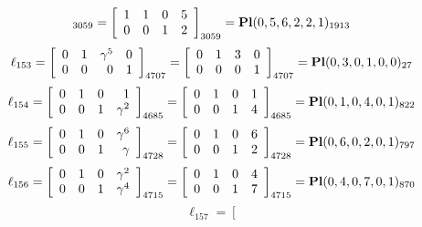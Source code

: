 \documentclass{article}
\begin{document}
{$$_{3059}
=
\left[
\begin{array}{*{4}c}
1  & 1  & 0  & 5\\
0  & 0  & 1  & 2\\
\end{array}
\right]_{3059}
={\rm\bf Pl}(0,5,6,2,2,1 )_{1913}$$
$$
\ell_{153} = 
\left[
\begin{array}{*{4}{r}}
0 & 1 & \gamma^{5} & 0\\
0 & 0 & 0 & 1\\
\end{array}
\right]
_{4707}
=
\left[
\begin{array}{*{4}c}
0  & 1  & 3  & 0\\
0  & 0  & 0  & 1\\
\end{array}
\right]_{4707}
={\rm\bf Pl}(0,3,0,1,0,0 )_{27}$$
$$
\ell_{154} = 
\left[
\begin{array}{*{4}{r}}
0 & 1 & 0 & 1\\
0 & 0 & 1 & \gamma^{2}\\
\end{array}
\right]
_{4685}
=
\left[
\begin{array}{*{4}c}
0  & 1  & 0  & 1\\
0  & 0  & 1  & 4\\
\end{array}
\right]_{4685}
={\rm\bf Pl}(0,1,0,4,0,1 )_{822}$$
$$
\ell_{155} = 
\left[
\begin{array}{*{4}{r}}
0 & 1 & 0 & \gamma^{6}\\
0 & 0 & 1 & \gamma \\
\end{array}
\right]
_{4728}
=
\left[
\begin{array}{*{4}c}
0  & 1  & 0  & 6\\
0  & 0  & 1  & 2\\
\end{array}
\right]_{4728}
={\rm\bf Pl}(0,6,0,2,0,1 )_{797}$$
$$
\ell_{156} = 
\left[
\begin{array}{*{4}{r}}
0 & 1 & 0 & \gamma^{2}\\
0 & 0 & 1 & \gamma^{4}\\
\end{array}
\right]
_{4715}
=
\left[
\begin{array}{*{4}c}
0  & 1  & 0  & 4\\
0  & 0  & 1  & 7\\
\end{array}
\right]_{4715}
={\rm\bf Pl}(0,4,0,7,0,1 )_{870}$$
$$
\ell_{157} = 
\left[
$$}
\end{document}
